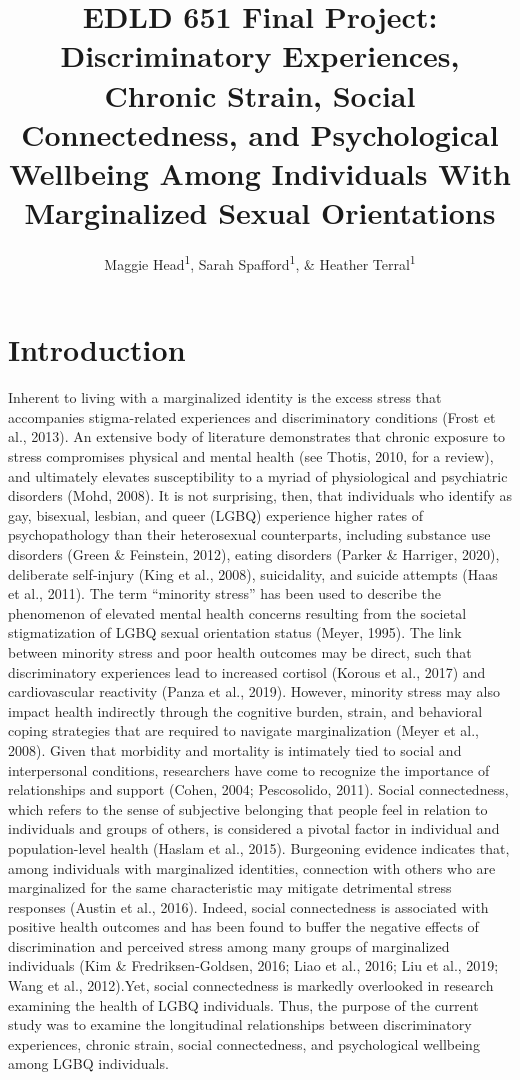 \documentclass[
  english,
  man,floatsintext]{apa6}
\title{EDLD 651 Final Project: Discriminatory Experiences, Chronic Strain, Social Connectedness, and Psychological Wellbeing Among Individuals With Marginalized Sexual Orientations}
\author{Maggie Head\textsuperscript{1}, Sarah Spafford\textsuperscript{1}, \& Heather Terral\textsuperscript{1}}
\date{}
\affiliation{\vspace{0.5cm}\textsuperscript{1} University of Oregon}
\begin{document}
\maketitle

\hypertarget{introduction}{%
\section{Introduction}\label{introduction}}

Inherent to living with a marginalized identity is the excess stress that accompanies stigma-related experiences and discriminatory conditions (Frost et al., 2013). An extensive body of literature demonstrates that chronic exposure to stress compromises physical and mental health (see Thotis, 2010, for a review), and ultimately elevates susceptibility to a myriad of physiological and psychiatric disorders (Mohd, 2008). It is not surprising, then, that individuals who identify as gay, bisexual, lesbian, and queer (LGBQ) experience higher rates of psychopathology than their heterosexual counterparts, including substance use disorders (Green \& Feinstein, 2012), eating disorders (Parker \& Harriger, 2020), deliberate self-injury (King et al., 2008), suicidality, and suicide attempts (Haas et al., 2011). The term ``minority stress'' has been used to describe the phenomenon of elevated mental health concerns resulting from the societal stigmatization of LGBQ sexual orientation status (Meyer, 1995). The link between minority stress and poor health outcomes may be direct, such that discriminatory experiences lead to increased cortisol (Korous et al., 2017) and cardiovascular reactivity (Panza et al., 2019). However, minority stress may also impact health indirectly through the cognitive burden, strain, and behavioral coping strategies that are required to navigate marginalization (Meyer et al., 2008).
Given that morbidity and mortality is intimately tied to social and interpersonal conditions, researchers have come to recognize the importance of relationships and support (Cohen, 2004; Pescosolido, 2011). Social connectedness, which refers to the sense of subjective belonging that people feel in relation to individuals and groups of others, is considered a pivotal factor in individual and population-level health (Haslam et al., 2015). Burgeoning evidence indicates that, among individuals with marginalized identities, connection with others who are marginalized for the same characteristic may mitigate detrimental stress responses (Austin et al., 2016). Indeed, social connectedness is associated with positive health outcomes and has been found to buffer the negative effects of discrimination and perceived stress among many groups of marginalized individuals (Kim \& Fredriksen-Goldsen, 2016; Liao et al., 2016; Liu et al., 2019; Wang et al., 2012).Yet, social connectedness is markedly overlooked in research examining the health of LGBQ individuals. Thus, the purpose of the current study was to examine the longitudinal relationships between discriminatory experiences, chronic strain, social connectedness, and psychological wellbeing among LGBQ individuals.
\end{document}
